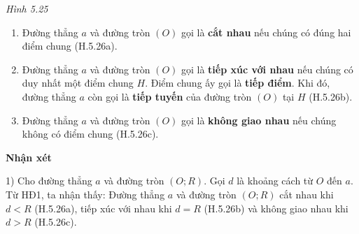 \begin{lesson}
\begin{center}
    \textit{Hình 5.25}
    \end{center}

    \begin{keyconcept}
        \begin{enumerate}[label=\arabic*)]
            \item Đường thẳng $a$ và đường tròn $(O)$ gọi là \textbf{cắt nhau} nếu chúng có đúng hai điểm chung (H.5.26a).
            \item Đường thẳng $a$ và đường tròn $(O)$ gọi là \textbf{tiếp xúc với nhau} nếu chúng có duy nhất một điểm chung $H$. Điểm chung ấy gọi là \textbf{tiếp điểm}. Khi đó, đường thẳng $a$ còn gọi là \textbf{tiếp tuyến} của đường tròn $(O)$ tại $H$ (H.5.26b).
            \item Đường thẳng $a$ và đường tròn $(O)$ gọi là \textbf{không giao nhau} nếu chúng không có điểm chung (H.5.26c).
        \end{enumerate}
    \end{keyconcept}

    \textbf{Nhận xét}

    1) Cho đường thẳng $a$ và đường tròn $(O;R)$. Gọi $d$ là khoảng cách từ $O$ đến $a$. Từ HĐ1, ta nhận thấy: Đường thẳng $a$ và đường tròn $(O;R)$ cắt nhau khi $d<R$ (H.5.26a), tiếp xúc với nhau khi $d=R$ (H.5.26b) và không giao nhau khi $d>R$ (H.5.26c).


\end{lesson}
